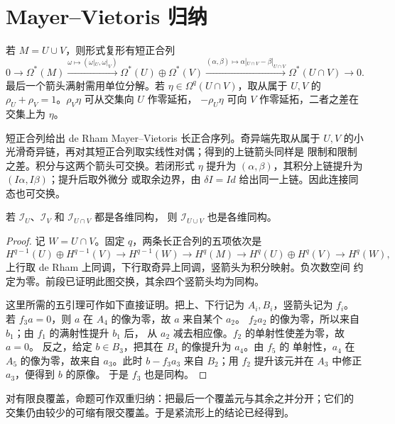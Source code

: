 \section{Mayer--Vietoris 归纳}

若 $M=U\cup V$，则形式复形有短正合列
\begin{equation}\label{eq:de-rham-mv-short-exact}
 0\to\Omega^*(M)\xrightarrow{\omega\mapsto(\omega|_U,\omega|_V)}
 \Omega^*(U)\oplus\Omega^*(V)
 \xrightarrow{(\alpha,\beta)\mapsto\alpha|_{U\cap V}-\beta|_{U\cap V}}
 \Omega^*(U\cap V)\to0.
\end{equation}
最后一个箭头满射需用单位分解。若 $\eta\in\Omega^q(U\cap V)$，取从属于
$U,V$ 的 $\rho_U+\rho_V=1$。$\rho_V\eta$ 可从交集向 $U$ 作零延拓，
$-\rho_U\eta$ 可向 $V$ 作零延拓，二者之差在交集上为 $\eta$。

短正合列给出 de Rham Mayer--Vietoris 长正合序列。奇异端先取从属于
$U,V$ 的小光滑奇异链，再对其短正合列取实线性对偶；得到的上链箭头同样是
限制和限制之差。积分与这两个箭头可交换。若闭形式 $\eta$ 提升为
$(\alpha,\beta)$，其积分上链提升为 $(I\alpha,I\beta)$；提升后取外微分
或取余边界，由 $\delta I=Id$ 给出同一上链。因此连接同态也可交换。

\begin{proposition}[有限并归纳]\label{prop:de-rham-finite-mv-induction}
若 $\mathcal I_U$、$\mathcal I_V$ 和 $\mathcal I_{U\cap V}$ 都是各维同构，
则 $\mathcal I_{U\cup V}$ 也是各维同构。
\end{proposition}
\begin{proof}
记 $W=U\cap V$。固定 $q$，两条长正合列的五项依次是
\[
 H^{q-1}(U)\oplus H^{q-1}(V)\longrightarrow H^{q-1}(W)
 \longrightarrow H^q(M)\longrightarrow H^q(U)\oplus H^q(V)
 \longrightarrow H^q(W),
\]
上行取 de Rham 上同调，下行取奇异上同调，竖箭头为积分映射。负次数空间
约定为零。前段已证明此图交换，其余四个竖箭头均为同构。

这里所需的五引理可作如下直接证明。把上、下行记为 $A_i,B_i$，竖箭头记为
$f_i$。若 $f_3a=0$，则 $a$ 在 $A_4$ 的像为零，故 $a$ 来自某个 $a_2$。
$f_2a_2$ 的像为零，所以来自 $b_1$；由 $f_1$ 的满射性提升 $b_1$ 后，
从 $a_2$ 减去相应像。$f_2$ 的单射性使差为零，故 $a=0$。
反之，给定 $b\in B_3$，把其在 $B_4$ 的像提升为 $a_4$。由 $f_5$ 的
单射性，$a_4$ 在 $A_5$ 的像为零，故来自 $a_3$。此时 $b-f_3a_3$ 来自
$B_2$；用 $f_2$ 提升该元并在 $A_3$ 中修正 $a_3$，便得到 $b$ 的原像。
于是 $f_3$ 也是同构。
\end{proof}

对有限良覆盖，命题可作双重归纳：把最后一个覆盖元与其余之并分开；它们的
交集仍由较少的可缩有限交覆盖。于是紧流形上的结论已经得到。

